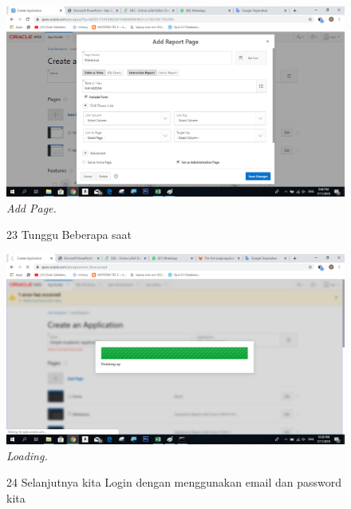 \begin{enumerate}
\begin{figure}
    \begin{center}
    \includegraphics[scale=0.6]{figures/25.png}
    \caption{\textit{Add Page.}}
    \end{center}
    \label{gambar}
    \end{figure}    

\begin{figure}
\item[23]Tunggu Beberapa saat

    \begin{center}
    \includegraphics[scale=0.6]{figures/26.png}
    \caption{\textit{Loading.}}
    \end{center}
    \label{gambar}
    \end{figure}   

\begin{figure}
\item[24]Selanjutnya kita Login dengan menggunakan email dan password kita


\end{figure}
\end{enumerate}
